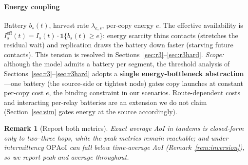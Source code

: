 \documentclass[twocolumn,3p,times,procedia]{elsarticle}
\newtheorem{remark}{Remark}
\newcommand{\OPAoI}{\mathrm{OPAoI}}
\newcommand{\ind}{\mathbb{1}}
\begin{document}
\paragraph*{Energy coupling}
Battery $b_s(t)$, harvest rate $\lambda_{e,s}$, per-copy energy $e$. The
effective availability is $I^{\mathrm{eff}}_s(t)=I_s(t)\cdot
\ind\{b_s(t)\ge e\}$: energy scarcity thins contacts (stretches the
residual wait) and replication draws the battery down faster (starving
future contacts). This tension is resolved in
Sections~\ref{sec:r3}--\ref{sec:r3hard}. \emph{Scope:} although the
model admits a battery per segment, the threshold analysis of
Sections~\ref{sec:r3}--\ref{sec:r3hard} adopts a \textbf{single
energy-bottleneck abstraction}---one battery (the source-side or
tightest node) gates copy launches at constant per-copy cost $e$, the
binding constraint in our scenarios. Route-dependent costs and
interacting per-relay batteries are an extension we do not claim
(Section~\ref{sec:sim} gates energy at the source accordingly).

\begin{remark}[Report both metrics]
Exact average AoI in tandems is closed-form only to two--three hops,
while the peak metrics remain reachable; and under intermittency
$\OPAoI$ can fall \emph{below} time-average AoI
(Remark~\ref{rem:inversion}), so we report peak and average
throughout.
\end{remark}
\end{document}
